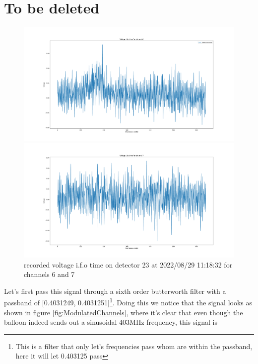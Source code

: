 \documentclass[11pt,a4paper,faculty=we,language=en,doctype=report]{cls/ugent-doc}
\begin{document}
\chapter{To be deleted}
\begin{figure}
	\begin{minipage}{0.49\textwidth}
		\includegraphics[width=\textwidth]{RawChannel6.pdf}
	\end{minipage}
	\begin{minipage}{0.49\textwidth}
		\includegraphics[width=\textwidth]{RawChannel7.pdf}
	\end{minipage}
	\caption{recorded voltage i.f.o time on detector 23 at 2022/08/29 11:18:32 for
	channels 6 and 7}
	\label{fig:voltage67}
\end{figure}
Let's first pass this signal through a sixth order butterworth filter with a
passband of [0.4031249, 0.4031251]\footnote{This is a filter that only let's
frequencies pass whom are within the passband, here it will let 0.403125 pass}. 
Doing this we notice that the signal looks as shown
in figure \ref{fig:ModulatedChannels}, where it's clear that even though the
balloon indeed sends out a sinusoidal 403MHz frequency, this signal is
\end{document}
